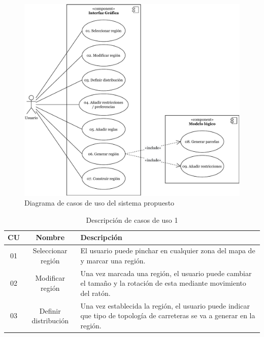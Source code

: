 \begin{figure}[!h]
	\centering
	\includegraphics[width=\textwidth]{images/casos-uso}
	\caption{Diagrama de casos de uso del sistema propuesto}
	\label{fig:casos-uso}
\end{figure}

\begin{table}[!h]
	\begin{tabularx}{\textwidth}{ c c X }
		\bfseries{CU} & \bfseries{Nombre} & \bfseries{Descripción} \\
		\hline
		01 & Seleccionar región & El usuario puede pinchar en cualquier zona del mapa de \cities y marcar una región. \\
		\hline
		02 & Modificar región & Una vez marcada una región, el usuario puede cambiar el tamaño y la rotación de esta mediante movimiento del ratón. \\
		\hline
		03 & Definir distribución & Una vez establecida la región, el usuario puede indicar que tipo de topología de carreteras se va a generar en la región. \\
		\hline
	\end{tabularx}
	\caption{Descripción de casos de uso 1}
	\label{table:casos-uso1}
\end{table}

